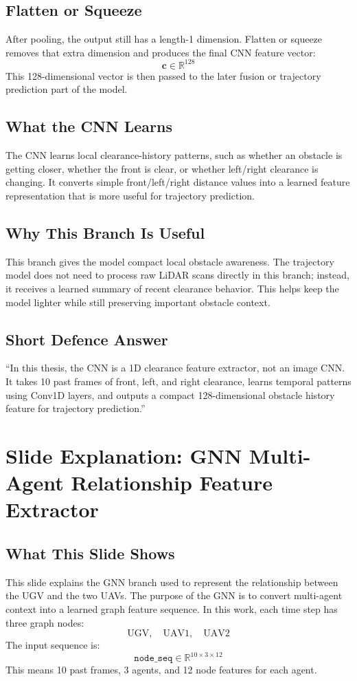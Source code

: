 \documentclass[11pt,a4paper]{article}
\begin{document}
\subsection*{Flatten or Squeeze}
After pooling, the output still has a length-1 dimension. Flatten or squeeze
removes that extra dimension and produces the final CNN feature vector:
\[
    \mathbf{c} \in \mathbb{R}^{128}
\]
This 128-dimensional vector is then passed to the later fusion or trajectory
prediction part of the model.

\subsection*{What the CNN Learns}
The CNN learns local clearance-history patterns, such as whether an obstacle is
getting closer, whether the front is clear, or whether left/right clearance is
changing. It converts simple front/left/right distance values into a learned
feature representation that is more useful for trajectory prediction.

\subsection*{Why This Branch Is Useful}
This branch gives the model compact local obstacle awareness. The trajectory
model does not need to process raw LiDAR scans directly in this branch; instead,
it receives a learned summary of recent clearance behavior. This helps keep the
model lighter while still preserving important obstacle context.

\subsection*{Short Defence Answer}
``In this thesis, the CNN is a 1D clearance feature extractor, not an image CNN.
It takes 10 past frames of front, left, and right clearance, learns temporal
patterns using Conv1D layers, and outputs a compact 128-dimensional obstacle
history feature for trajectory prediction.''

\newpage
\section*{Slide Explanation: GNN Multi-Agent Relationship Feature Extractor}

\subsection*{What This Slide Shows}
This slide explains the GNN branch used to represent the relationship between
the UGV and the two UAVs. The purpose of the GNN is to convert multi-agent
context into a learned graph feature sequence. In this work, each time step has
three graph nodes:
\[
    \text{UGV},\quad \text{UAV1},\quad \text{UAV2}
\]
The input sequence is:
\[
    \texttt{node\_seq} \in \mathbb{R}^{10 \times 3 \times 12}
\]
This means 10 past frames, 3 agents, and 12 node features for each agent.
\end{document}
